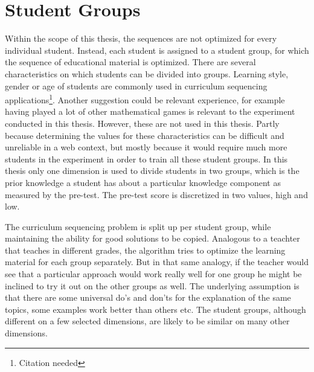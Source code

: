 \section{Student Groups}
\label{sec:task_student_groups}
Within the scope of this thesis, the sequences are not optimized for every
individual student. Instead, each student is assigned to a student group, for
which the sequence of educational material is optimized. There are several
characteristics on which students can be divided into groups. Learning style,
gender or age of students are commonly used in curriculum sequencing
applications\footnote{Citation needed}. Another suggestion could be relevant
experience, for example having played a lot of other mathematical games is
relevant to the experiment conducted in this thesis. However, these are not
used in this thesis. Partly because determining the values for these
characteristics can be difficult and unreliable in a web context, but mostly
because it would require much more students in the experiment in order to train
all these student groups. In this thesis only one dimension is used to divide
students in two groups, which is the prior knowledge a student has about a
particular knowledge component as measured by the pre-test. The pre-test score
is discretized in two values, high and low.

The curriculum sequencing problem is split up per student group,
while maintaining the ability for good solutions to be copied.
Analogous to a teachter that teaches in different grades, the algorithm
tries to optimize the learning material for each group separately. But
in that same analogy, if the teacher would see that a particular
approach would work really well for one group he might be inclined to
try it out on the other groups as well. The underlying assumption is
that there are some universal do's and don'ts for the explanation of
the same topics, some examples work better than others etc. The student
groups, although different on a few selected dimensions, are likely to
be similar on many other dimensions.


